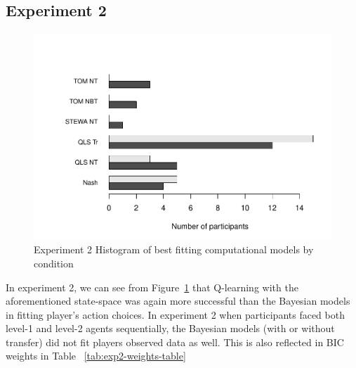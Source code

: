 \documentclass[man,floatsintext]{apa6}
\begin{document}
\hypertarget{experiment-2-1}{%
\subsection{Experiment 2}\label{experiment-2-1}}

\begin{figure}

{\centering \includegraphics{draft_upgrade_v1_files/figure-latex/exp2-comp-models-1} 

}

\caption{Experiment 2 Histogram of best fitting computational models by condition}\label{fig:exp2-comp-models}
\end{figure}



\begin{table}

\caption{\label{tab:exp2-weights-table}Experiment 2 - Average BIC weights and number of participants best fit by model}
\centering
{}
\end{table}

In experiment 2, we can see from Figure~\ref{fig:exp2-comp-models} that Q-learning with the aforementioned state-space was again more successful than the Bayesian models in fitting player's action choices. In experiment 2 when participants faced both level-1 and level-2 agents sequentially, the Bayesian models (with or without transfer) did not fit players observed data as well. This is also reflected in BIC weights in Table ~\ref{tab:exp2-weights-table}
\end{document}

